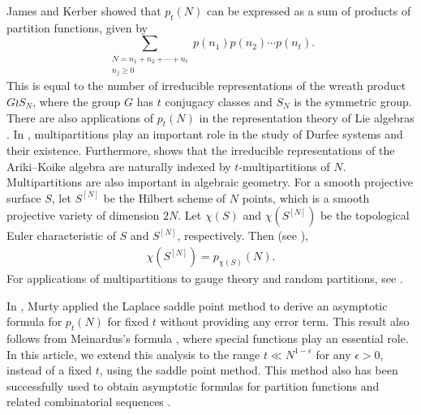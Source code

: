 \documentclass[10pt,a4paper]{amsart}
\numberwithin{equation}{section}
\begin{document}
	James and Kerber \cite[Corollary 4.4.4]{MR644144} showed that $p_t(N)$ can be expressed as a sum of products of partition functions, given by
	\begin{equation*}
		\sum_{\substack{N=n_{1}+n_{2}+\cdots+n_{t}\\ n_{j}\ge 0}} p(n_{1})p(n_{2})\cdots p(n_{t}).
	\end{equation*}
	This is equal to the number of irreducible representations of the wreath product $G \wr S_N$, where the group $G$ has $t$ conjugacy classes and $S_N$ is the symmetric group. There are also applications of $p_t(N)$ in the representation theory of Lie algebras \cite{bouwknegt2002,fayers2006weights}. In \cite{bouwknegt2002}, multipartitions play an important role in the study of Durfee systems and their existence. Furthermore, \cite{fayers2006weights} shows that the irreducible representations of the Ariki--Koike algebra are naturally indexed by $t$-multipartitions of $N$. Multipartitions are also important in algebraic geometry. For a smooth projective surface $S$, let $S^{[N]}$ be the Hilbert scheme of $N$ points, which is a smooth projective variety of dimension $2N.$ Let $\chi(S)$ and $\chi(S^{[N]})$ be the topological Euler characteristic of $S$ and $S^{[N]}$, respectively. Then (see \cite[equation $(2)$, Theorem 0.1]{gottsche}),
	\begin{align*}
		\chi\left(S^{[N]}\right)=p_{\chi(S)}(N).
	\end{align*}
	For applications of multipartitions to gauge theory and random partitions, see \cite{nekrasov}. 
	
	
	In \cite{murty2013partition}, Murty applied the Laplace saddle point method to derive an asymptotic formula for $p_t(N)$ for fixed $t$ without providing any error term. This result also follows from Meinardus's formula \cite{meinardus1953}, where special functions play an essential role. In this article, we extend this analysis to the range $t \ll N^{1-\epsilon}$ for any $\epsilon>0$, instead of a fixed $t$, using the saddle point method. This method also has been successfully used to obtain asymptotic formulas for partition functions and related combinatorial sequences \cite{barman2025lower, barman2026asymptotic, tyler2026asymptotics}. %
	
\end{document}

